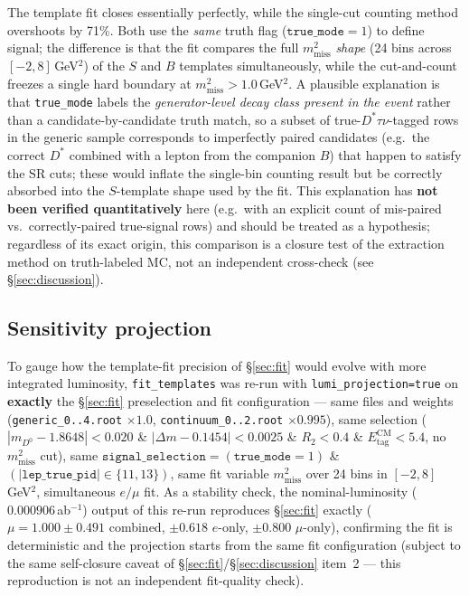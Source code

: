 \documentclass[11pt]{article}
\newcommand{\mmiss}{m^2_{\mathrm{miss}}}
\newcommand{\Etag}{E_{\mathrm{tag}}^{\mathrm{CM}}}
\begin{document}
The template fit closes essentially perfectly, while the single-cut
counting method overshoots by 71\%. Both use the \emph{same} truth flag
($\texttt{true\_mode}{=}1$) to define signal; the difference is that the
fit compares the full $\mmiss$ \emph{shape} (24 bins across
$[-2,8]$\,GeV$^2$) of the $S$ and $B$ templates simultaneously, while the
cut-and-count freezes a single hard boundary at $\mmiss > 1.0$\,GeV$^2$.
A plausible explanation is that \texttt{true\_mode} labels the
\emph{generator-level decay class present in the event} rather than a
candidate-by-candidate truth match, so a subset of
true-$D^{*}\tau\nu$-tagged rows in the generic sample corresponds to
imperfectly paired candidates (e.g.\ the correct $D^{*}$ combined with a
lepton from the companion $B$) that happen to satisfy the SR cuts; these
would inflate the single-bin counting result but be correctly absorbed
into the $S$-template shape used by the fit. This explanation has
\textbf{not been verified quantitatively} here (e.g.\ with an explicit
count of mis-paired vs.\ correctly-paired true-signal rows) and should be
treated as a hypothesis; regardless of its exact origin, this comparison
is a closure test of the extraction method on truth-labeled MC, not an
independent cross-check (see \S\ref{sec:discussion}).

\subsection{Sensitivity projection}
\label{sec:projection}

To gauge how the template-fit precision of \S\ref{sec:fit} would evolve
with more integrated luminosity, \texttt{fit\_templates} was re-run with
\texttt{lumi\_projection=true} on \textbf{exactly} the \S\ref{sec:fit}
preselection and fit configuration --- same files and weights
(\texttt{generic\_0..4.root} $\times 1.0$, \texttt{continuum\_0..2.root}
$\times 0.995$), same selection
($|m_{D^0}-1.8648|<0.020$ \& $|\Delta m - 0.1454|<0.0025$ \& $R_2<0.4$ \&
$\Etag<5.4$, no $\mmiss$ cut), same
$\texttt{signal\_selection} = (\texttt{true\_mode}{=}1)$ \&
$(|\texttt{lep\_true\_pid}|\in\{11,13\})$,
same fit variable $\mmiss$ over 24 bins in $[-2,8]$\,GeV$^2$,
simultaneous $e/\mu$ fit. As a stability check, the nominal-luminosity
($0.000906$\,ab$^{-1}$) output of this re-run reproduces \S\ref{sec:fit}
exactly ($\mu = 1.000 \pm 0.491$ combined, $\pm 0.618$ $e$-only,
$\pm 0.800$ $\mu$-only), confirming the fit is deterministic and the
projection starts from the same fit configuration (subject to the same
self-closure caveat of \S\ref{sec:fit}/\S\ref{sec:discussion} item~2 ---
this reproduction is not an independent fit-quality check).
\end{document}

